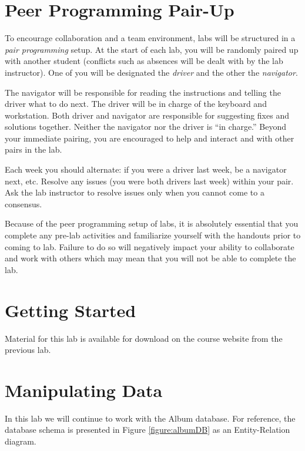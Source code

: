 \documentclass[12pt]{scrartcl}
\begin{document}
\section*{Peer Programming Pair-Up}

To encourage collaboration and a team environment, labs will be
structured in a \emph{pair programming} setup.  At the start of
each lab, you will be randomly paired up with another student 
(conflicts such as absences will be dealt with by the lab instructor).
One of you will be designated the \emph{driver} and the other
the \emph{navigator}.  

The navigator will be responsible for reading the instructions and
telling the driver what to do next.  The driver will be in charge of the
keyboard and workstation.  Both driver and navigator are responsible
for suggesting fixes and solutions together.  Neither the navigator
nor the driver is ``in charge.''  Beyond your immediate pairing, you
are encouraged to help and interact and with other pairs in the lab.

Each week you should alternate: if you were a driver last week, 
be a navigator next, etc.  Resolve any issues (you were both drivers
last week) within your pair.  Ask the lab instructor to resolve issues
only when you cannot come to a consensus.  

Because of the peer programming setup of labs, it is absolutely 
essential that you complete any pre-lab activities and familiarize
yourself with the handouts prior to coming to lab.  Failure to do
so will negatively impact your ability to collaborate and work with 
others which may mean that you will not be able to complete the
lab.  

\section*{Getting Started}

Material for this lab is available for download on the course website
from the previous lab.

\section*{Manipulating Data}

In this lab we will continue to work with the Album database.  For 
reference, the database schema is presented in Figure \ref{figure:albumDB} 
as an Entity-Relation diagram.
\end{document}
